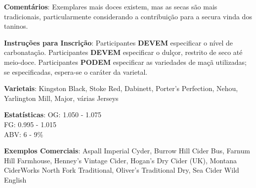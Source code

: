 \textbf{Comentários}: Exemplares mais doces existem, mas as secas são mais tradicionais, particularmente considerando a contribuição para a secura vinda dos taninos.

\textbf{Instruções para Inscrição}: Participantes \textbf{DEVEM} especificar o nível de carbonatação. Participantes \textbf{DEVEM} especificar o dulçor, restrito de seco até meio-doce. Participantes \textbf{PODEM} especificar as variedades de maçã utilizadas; se especificadas, espera-se o caráter da varietal.

\textbf{Varietais}: Kingston Black, Stoke Red, Dabinett, Porter's Perfection, Nehou, Yarlington Mill, Major, várias Jerseys

\textbf{Estatísticas}: OG: 1.050 - 1.075 \\
\phantom{ } \hspace{16.5mm} FG: 0.995 - 1.015 \\
\phantom{ } \hspace{16.5mm} ABV: 6 - 9\%

\textbf{Exemplos Comerciais}: Aspall Imperial Cyder, Burrow Hill Cider Bus, Farnum Hill Farmhouse, Henney's Vintage Cider, Hogan's Dry Cider (UK), Montana CiderWorks North Fork Traditional, Oliver's Traditional Dry, Sea Cider Wild English
